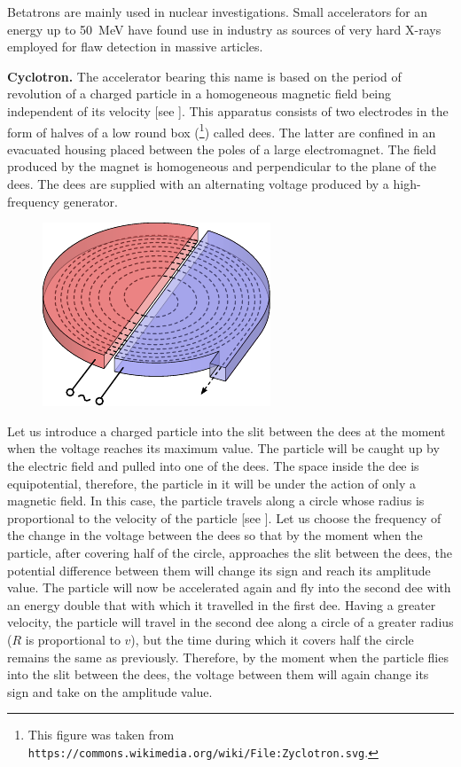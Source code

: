 Betatrons are mainly used in nuclear investigations. Small accelerators for an energy up to \SI{50}{\mega\electronvolt} have found use in industry as sources of very hard X-rays employed for flaw detection in massive articles.

\textbf{Cyclotron.} The accelerator bearing this name is based on the period of revolution of a charged particle in a homogeneous magnetic field being independent of its velocity [see ].
This apparatus consists of two electrodes in the form of halves of a low round box (\footnote{This figure was taken from \texttt{https://commons.wikimedia.org/wiki/File:Zyclotron.svg}.}) called dees.
The latter are confined in an evacuated housing placed between the poles of a large electromagnet.
The field produced by the magnet is homogeneous and perpendicular to the plane of the dees.
The dees are supplied with an alternating voltage produced by a high-frequency generator.

\begin{figure}[t]
	\begin{center}
		\includegraphics[scale=1]{figures/ch_10/fig_10_16.pdf}
		\caption[]{}
		\label{fig:10_16}
	\end{center}
	\vspace{-0.8cm}
\end{figure}

Let us introduce a charged particle into the slit between the dees at the moment when the voltage reaches its maximum value.
The particle will be caught up by the electric field and pulled into one of the dees.
The space inside the dee is equipotential, therefore, the particle in it will be under the action of only a magnetic field.
In this case, the particle travels along a circle whose radius is proportional to the velocity of the particle [see ].
Let us choose the frequency of the change in the voltage between the dees so that by the moment when the particle, after covering half of the circle, approaches the slit between the dees, the potential difference between them will change its sign and reach its amplitude value.
The particle will now be accelerated again and fly into the second dee with an energy double that with which it travelled in the first dee.
Having a greater velocity, the particle will travel in the second dee along a circle of a greater radius ($R$ is proportional to $v$), but the time during which it covers half the circle remains the same as previously.
Therefore, by the moment when the particle flies into the slit between the dees, the voltage between them will again change its sign and take on the amplitude value.

